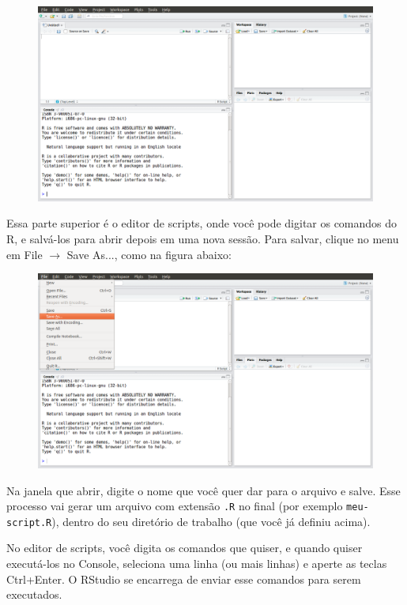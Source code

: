 \documentclass[a4paper,12pt]{article}\usepackage[]{graphicx}\usepackage[]{color}
\providecommand{\R}{\textsf{R}\xspace}
\providecommand{\RStudio}{\textsf{RStudio}\xspace}
\begin{document}
\begin{figure}[H]
  \centering
  \includegraphics[width=\textwidth]{figure/RStudio_008}
\end{figure}

Essa parte superior é o editor de scripts, onde você pode digitar os
comandos do \R, e salvá-los para abrir depois em uma nova sessão. Para
salvar, clique no menu em \textsf{File $\rightarrow$ Save As...}, como
na figura abaixo:

\begin{figure}[H]
  \centering
  \includegraphics[width=\textwidth]{figure/RStudio_009}
\end{figure}

Na janela que abrir, digite o nome que você quer dar para o arquivo e
salve. Esse processo vai gerar um arquivo com extensão \texttt{.R} no
final (por exemplo \texttt{meu-script.R}), dentro do seu diretório de
trabalho (que você já definiu acima).

No editor de scripts, você digita os comandos que quiser, e quando
quiser executá-los no \textsf{Console}, seleciona uma linha (ou mais
linhas) e aperte as teclas \textsf{Ctrl+Enter}. O \RStudio se encarrega
de enviar esse comandos para serem executados.
\end{document}
